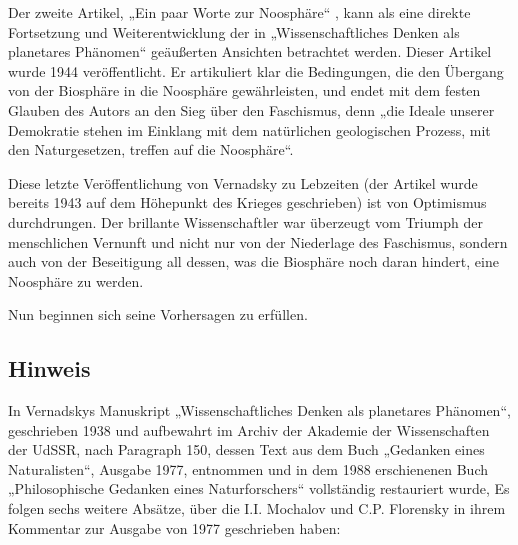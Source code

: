 \documentclass[11pt,a4paper]{article}
\begin{document}
Der zweite Artikel, „Ein paar Worte zur Noosphäre“ \cite{Vernadsky1944}, kann
als eine direkte Fortsetzung und Weiterentwicklung der in „Wissenschaftliches
Denken als planetares Phänomen“ geäußerten Ansichten betrachtet werden. Dieser
Artikel wurde 1944 veröffentlicht. Er artikuliert klar die Bedingungen, die
den Übergang von der Biosphäre in die Noosphäre gewährleisten, und endet mit
dem festen Glauben des Autors an den Sieg über den Faschismus, denn „die
Ideale unserer Demokratie stehen im Einklang mit dem natürlichen geologischen
Prozess, mit den Naturgesetzen, treffen auf die Noosphäre“.

Diese letzte Veröffentlichung von Vernadsky zu Lebzeiten (der Artikel wurde
bereits 1943 auf dem Höhepunkt des Krieges geschrieben) ist von Optimismus
durchdrungen. Der brillante Wissenschaftler war überzeugt vom Triumph der
menschlichen Vernunft und nicht nur von der Niederlage des Faschismus, sondern
auch von der Beseitigung all dessen, was die Biosphäre noch daran hindert,
eine Noosphäre zu werden.

Nun beginnen sich seine Vorhersagen zu erfüllen.

\subsection*{Hinweis}

In Vernadskys Manuskript „Wissenschaftliches Denken als planetares Phänomen“,
geschrieben 1938 und aufbewahrt im Archiv der Akademie der Wissenschaften der
UdSSR, nach Paragraph 150, dessen Text aus dem Buch „Gedanken eines
Naturalisten“, Ausgabe 1977, entnommen und in dem 1988 erschienenen Buch
„Philosophische Gedanken eines Naturforschers“ vollständig restauriert wurde,
Es folgen sechs weitere Absätze, über die I.I. Mochalov und C.P. Florensky
in ihrem Kommentar zur Ausgabe von 1977 geschrieben haben:
\end{document}

